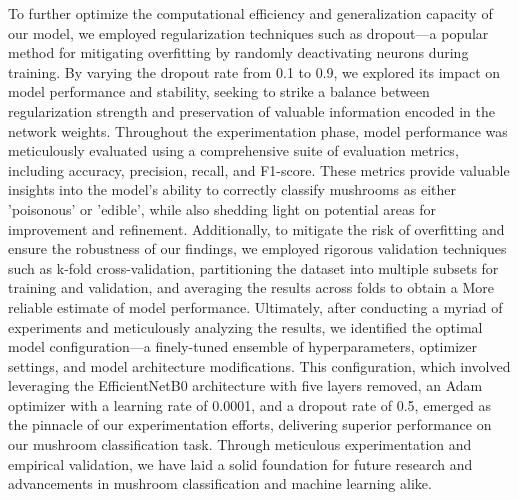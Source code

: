 To further optimize the computational efficiency and generalization capacity of our model, we employed regularization techniques such as dropout—a popular method for mitigating overfitting by randomly deactivating neurons during training. By varying the dropout rate from 0.1 to 0.9, we explored its impact on model performance and stability, seeking to strike a balance between regularization strength and preservation of valuable information encoded in the network weights. Throughout the experimentation phase, model performance was meticulously evaluated using a comprehensive suite of evaluation metrics, including accuracy, precision, recall, and F1-score. These metrics provide valuable insights into the model's ability to correctly classify mushrooms as either 'poisonous' or 'edible', while also shedding light on potential areas for improvement and refinement. Additionally, to mitigate the risk of overfitting and ensure the robustness of our findings, we employed rigorous validation techniques such as k-fold cross-validation, partitioning the dataset into multiple subsets for training and validation, and averaging the results across folds to obtain a More reliable estimate of model performance. Ultimately, after conducting a myriad of experiments and meticulously analyzing the results, we identified the optimal model configuration—a finely-tuned ensemble of hyperparameters, optimizer settings, and model architecture modifications. This configuration, which involved leveraging the EfficientNetB0 architecture with five layers removed, an Adam optimizer with a learning rate of 0.0001, and a dropout rate of 0.5, emerged as the pinnacle of our experimentation efforts, delivering superior performance on our mushroom classification task. Through meticulous experimentation and empirical validation, we have laid a solid foundation for future research and advancements in mushroom classification and machine learning alike. 